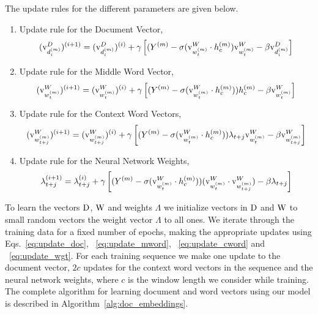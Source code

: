 The update rules for the different parameters are given below.
\begin{enumerate}
\item 
Update rule for the Document Vector,
\begin{equation}
\label{eq:update_doc}
(\mathrm{v}^{D}_{d^{(m)}_{i}})^{(i+1)} = (\mathrm{v}^{D}_{d^{(m)}_{i}})^{(i)} + \gamma \left[ (Y^{(m)} - \sigma(\mathrm{v}^{W}_{w^{(m)}_{t}} \cdot h^{(m)}_{c} )\mathrm{v}^{W}_{w^{(m)}_{t}} - \beta\mathrm{v}^{D}_{d^{(m)}_{i}} \right]
\end{equation}
\item 
Update rule for the Middle Word Vector, 
\begin{equation}
\label{eq:update_mword}
(\mathrm{v}^{W}_{w^{(m)}_{t}})^{(i+1)} = (\mathrm{v}^{W}_{w^{(m)}_{t}})^{(i)} + \gamma \left[ (Y^{(m)} - \sigma(\mathrm{v}^{W}_{w^{(m)}_{t}} \cdot h^{(m)}_{c})) h^{(m)}_{c} - \beta\mathrm{v}^{W}_{w^{(m)}_{t}} \right]
\end{equation}
\item 
Update rule for the Context Word Vectors,
\begin{equation}
\label{eq:update_cword}
(\mathrm{v}^{W}_{w^{(m)}_{t+j}})^{(i+1)} = (\mathrm{v}^{W}_{w^{(m)}_{t+j}})^{(i)} + \gamma \left[(Y^{(m)} - \sigma(\mathrm{v}^{W}_{w^{(m)}_{t}} \cdot h^{(m)}_{c}))\lambda_{t+j} \mathrm{v}^{W}_{w^{(m)}_{t}} - \beta\mathrm{v}^{W}_{w^{(m)}_{t+j}} \right]
\end{equation}
\item 
Update rule for the Neural Network Weights,
\begin{equation}
\label{eq:update_wgt}
\lambda_{t+j}^{(i+1)} = \lambda_{t+j}^{(i)} + \gamma \left[ (Y^{(m)} - \sigma(\mathrm{v}^{W}_{w^{(m)}_{t}} \cdot h^{(m)}_{c}))(\mathrm{v}^{W}_{w^{(m)}_{t}} \cdot \mathrm{v}^{W}_{w^{(m)}_{t+j}}) -\beta\lambda_{t+j} \right]
\end{equation}
\end{enumerate}
To learn the vectors $\mathrm{D}$, $\mathrm{W}$ and weights $\Lambda$ we initialize vectors in $\mathrm{D}$ and $\mathrm{W}$ to small random vectors the weight vector $\Lambda$ to all ones. We iterate through the training data for a fixed number of epochs, making the appropriate updates using Eqs.~\ref{eq:update_doc}, ~\ref{eq:update_mword}, ~\ref{eq:update_cword} and ~\ref{eq:update_wgt}. For each training sequence we make one update to the document vector, $2c$ updates for the context word vectors in the sequence and the neural network weights, where $c$ is the window length we consider while training. The complete algorithm for learning document and word vectors using our model is described in Algorithm~\ref{alg:doc_embeddings}.

